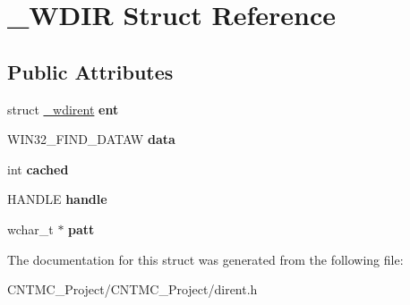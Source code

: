 \hypertarget{struct___w_d_i_r}{}\section{\+\_\+\+W\+D\+I\+R Struct Reference}
\label{struct___w_d_i_r}
\subsection*{Public Attributes}
\begin{DoxyCompactItemize}
\item 
\hypertarget{struct___w_d_i_r_a84ae1457352005f813ed4b3dc1994b62}{}struct \hyperlink{struct__wdirent}{\+\_\+wdirent} {\bfseries ent}\label{struct___w_d_i_r_a84ae1457352005f813ed4b3dc1994b62}

\item 
\hypertarget{struct___w_d_i_r_a065b17b666ee06c4e8068d8accb0eef9}{}W\+I\+N32\+\_\+\+F\+I\+N\+D\+\_\+\+D\+A\+T\+A\+W {\bfseries data}\label{struct___w_d_i_r_a065b17b666ee06c4e8068d8accb0eef9}

\item 
\hypertarget{struct___w_d_i_r_a9b7432df163d1e291ba5925347fd4af3}{}int {\bfseries cached}\label{struct___w_d_i_r_a9b7432df163d1e291ba5925347fd4af3}

\item 
\hypertarget{struct___w_d_i_r_a694510e166fd3e797b3e15b9e4b3810a}{}H\+A\+N\+D\+L\+E {\bfseries handle}\label{struct___w_d_i_r_a694510e166fd3e797b3e15b9e4b3810a}

\item 
\hypertarget{struct___w_d_i_r_a700ff3a1096fb36452c571b0f55b4e60}{}wchar\+\_\+t $\ast$ {\bfseries patt}\label{struct___w_d_i_r_a700ff3a1096fb36452c571b0f55b4e60}

\end{DoxyCompactItemize}


The documentation for this struct was generated from the following file\+:\begin{DoxyCompactItemize}
\item 
C\+N\+T\+M\+C\+\_\+\+Project/\+C\+N\+T\+M\+C\+\_\+\+Project/dirent.\+h\end{DoxyCompactItemize}
